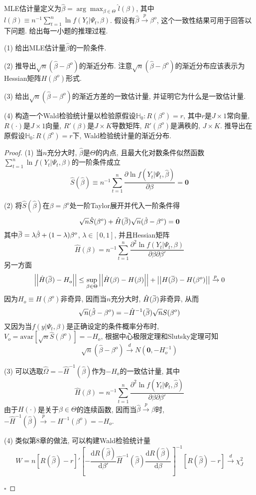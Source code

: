 \documentclass[cn,12pt,math=mtpro2,citestyle=gb7714-2015,bibstyle=gb7714-2015,twocol,mode=simple]{elegantbook}
\newcommand{\overbar}[1]{\mkern 1.5mu\overline{\mkern-1.5mu#1\mkern-1.5mu}\mkern 1.5mu}
\newcommand{\HH}{\mathbb{H}}
\newcommand{\hbeta}{\hat{\beta}}
\newcommand{\dd}{\text{d}}
\begin{document}
MLE估计量定义为$\displaystyle\hat{\beta}=\arg\max_{\beta\in\Theta}\hat{l}(\beta)$, 其中$l(\beta)\equiv\displaystyle n^{-1}\sum_{t=1}^{n}\ln f(Y_t|\Psi_t,\beta)$. 假设有$\hat{\beta}\xrightarrow{p}\beta^o$, 这个一致性结果可用于回答以下问题. 给出每一小题的推理过程.

(1) 给出MLE估计量$\hbeta$的一阶条件.

(2) 推导出$\sqrt{n}(\hbeta-\beta^o)$的渐近分布. 注意$\sqrt{n}(\hbeta-\beta^o)$的渐近分布应该表示为Hessian矩阵$H(\beta^o)$形式.

(3) 给出$\sqrt{n}(\hbeta-\beta^o)$的渐近方差的一致估计量, 并证明它为什么是一致估计量.

(4) 构造一个Wald检验统计量以检验原假设$\HH_0:R(\beta^o)=r$, 其中$r$是$J\times1$常向量, $R(\cdot)$是$J\times 1$向量, $R'(\beta)$是$J\times K$导数矩阵, $R'(\beta^o)$是满秩的, $J\times K$. 推导出在原假设$\HH_0: R(\beta^o)=r$下, Wald检验统计量的渐近分布.

\begin{proof}
  (1) 当$n$充分大时, $\hbeta$是$\Theta$的内点, 且最大化对数条件似然函数$\displaystyle\sum_{t=1}^{n}\ln f(Y_t|\Psi_t,\beta)$的一阶条件成立
  $$\hat{S}(\hbeta)\equiv n^{-1}\sum_{t=1}^{n}\frac{\partial\ln f(Y_t|\Psi_t,\hbeta)}{\partial\beta}=\mathbf{0}$$

  (2) 将$\hat{S}(\hbeta)$在$\beta=\beta^o$处一阶Taylor展开并代入一阶条件得
  $$\sqrt{n}\hat{S}(\beta^o)+\hat{H}(\overbar{\beta})\sqrt{n}(\hbeta-\beta^o)=\mathbf{0}$$
  其中$\overbar{\beta}=\lambda\hat{\beta}+(1-\lambda)\beta^o$, $\lambda\in[0,1]$, 并且Hessian矩阵
  $$\hat{H}(\beta)=n^{-1}\sum_{t=1}^{n}\frac{\partial^2\ln f(Y_t|\Psi_t,\beta)}{\partial\beta\partial\beta'}$$
  另一方面
  $$\left|\left|\hat{H}(\overbar{\beta})-H_o \right|\right|\leq\sup_{\beta\in\Theta}\left|\left|\hat{H}(\beta)-H(\beta) \right|\right|+\left|\left|H(\overbar{\beta})-H(\beta^o) \right|\right|\xrightarrow{p}0$$
  因为$H_o\equiv H(\beta^o)$非奇异, 因而当$n$充分大时, $\hat{H}(\overbar{\beta})$非奇异, 从而
  $$\sqrt{n}(\hbeta-\beta^o)=-\hat{H}^{-1}(\overbar{\beta})\sqrt{n}S(\beta^o)$$
 又因为当$f(y|\Psi_t,\beta)$是正确设定的条件概率分布时, $V_o=\text{avar}[\sqrt{n}\hat{S}(\beta^o)]=-H_o$, 根据中心极限定理和Slutsky定理可知
 $$\sqrt{n}(\hbeta-\beta^o)\xrightarrow{d}N(\mathbf{0},-H_o^{-1})$$

 (3) 可以选取$\displaystyle\hat{\Omega}=-\hat{H}^{-1}(\hat{\beta})$作为$-H_o$的一致估计量, 其中
 $$\hat{H}(\beta)=n^{-1}\sum_{t=1}^{n}\frac{\partial^2\ln f(Y_t|\Psi_t,\hbeta)}{\partial\beta\partial\beta'}$$
 由于$H(\cdot)$是关于$\beta\in\Theta$的连续函数, 因而当$\hbeta\xrightarrow{p}\beta$时, $-\hat{H}^{-1}(\hbeta)\xrightarrow{p}-H^{-1}(\beta^o)=-H_o$.

 (4) 类似第8章的做法, 可以构建Wald检验统计量
 $$W=n[R(\hbeta)-r]'\left[-\frac{\dd R(\hbeta)}{\dd\beta'}\hat{H}^{-1}(\hbeta)\frac{\dd R(\hbeta)}{\dd\beta}\right]^{-1}[R(\hbeta)-r]\xrightarrow{d}\chi_J^2$$

 $\square$
\end{proof}
\end{document}
